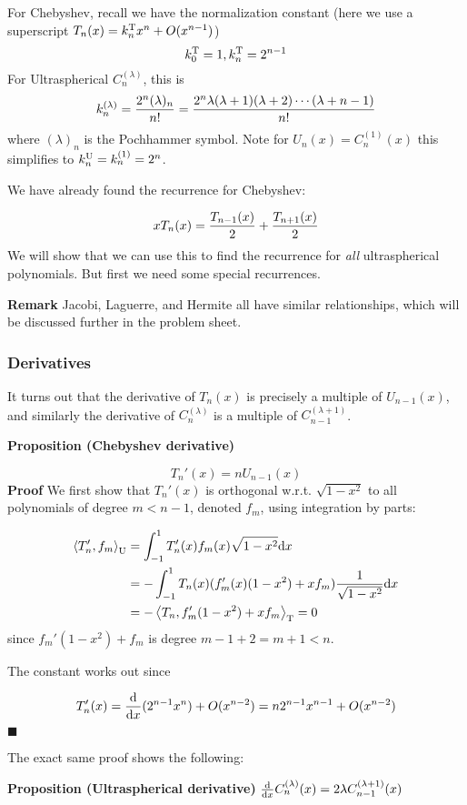 \documentclass[12pt,landscape]{article}
\def\D{ {\rm d} }
\def\addtab#1={#1\;&=}
\def\ccr{\\\addtab}
\def\ip<#1>{\left\langle{#1}\right\rangle}
\def\dx{\D x}
\def\addtab#1={#1\;&=}
\def\ccr{\\\addtab}
\begin{document}
{For Chebyshev, recall we have the normalization constant (here we use a superscript $T_n(x) = k_n^{\rm T} x^n + O(x^{n-1})$)
\[
k_0^{\rm T} = 1, k_n^{\rm T} = 2^{n-1}
\]
For Ultraspherical $C_n^{(\lambda)}$, this is
\[
k_n^{(\lambda)} = {2^n (\lambda)_n \over n!} = {2^n \lambda (\lambda+1) (\lambda+2) \cdots (\lambda+n-1)  \over n!}
\]
where $(\lambda)_n$ is the Pochhammer symbol. Note for $U_n(x) = C_n^{(1)}(x)$ this simplifies to $k_n^{\rm U} = k_n^{(1)} = 2^n$.

We have  already found the recurrence for Chebyshev:

\[
x T_n(x) = {T_{n-1}(x) \over 2} +  {T_{n+1}(x) \over 2}
\]
We will show that we can use this to find the recurrence for \emph{all} ultraspherical polynomials. But first we need some special recurrences.

\textbf{Remark} Jacobi, Laguerre, and Hermite all have similar relationships, which will be discussed further in the problem sheet.

\subsubsection{Derivatives}
It turns out that the derivative of $T_n(x)$ is precisely a multiple of  $U_{n-1}(x)$, and similarly the derivative of $C_n^{(\lambda)}$ is a multiple of $C_{n-1}^{(\lambda+1)}$.

\textbf{Proposition (Chebyshev derivative)}

\[
T_n'(x) = n U_{n-1}(x)
\]
\textbf{Proof} We first show that $T_n'(x)$ is orthogonal w.r.t. $\sqrt{1-x^2}$ to all  polynomials of degree $m < n-1$, denoted $f_m$, using integration by parts:


\begin{align*}
\ip<T_n',f_m>_{\rm U} &= \int_{-1}^1 T_n'(x) f_m(x) \sqrt{1-x^2} \dx \ccr
= -\int_{-1}^1 T_n(x) (f_m'(x)(1-x^2) + xf_m) {1  \over \sqrt{1-x^2}} \dx  \ccr
= - \ip<T_n, f_m'(1-x^2) + x f_m >_{\rm T}  = 0
\end{align*}
since $f_m'(1-x^2) + f_m $ is degree $m-1 +2 = m+1 < n$.

The constant works out since

\[
T_n'(x) = {\D \over \dx} (2^{n-1} x^n)  + O(x^{n-2}) = n 2^{n-1} x^{n-1} + O(x^{n-2})
\]
\ensuremath{\blacksquare}

The exact same proof shows the following:

\textbf{Proposition (Ultraspherical derivative)} ${\D \over \dx} C_n^{(\lambda)}(x) = 2 \lambda  C_{n-1}^{(\lambda+1)}(x)$

}
\end{document}
